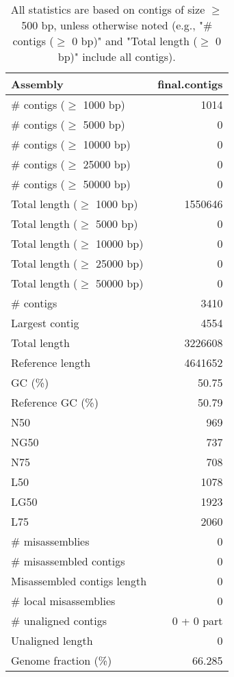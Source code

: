 \documentclass[12pt,a4paper]{article}
\begin{document}
\begin{table}[ht]
\begin{center}
\caption{All statistics are based on contigs of size $\geq$ 500 bp, unless otherwise noted (e.g., "\# contigs ($\geq$ 0 bp)" and "Total length ($\geq$ 0 bp)" include all contigs).}
\begin{tabular}{|l*{1}{|r}|}
\hline
Assembly & final.contigs \\ \hline
\# contigs ($\geq$ 1000 bp) & 1014 \\ \hline
\# contigs ($\geq$ 5000 bp) & 0 \\ \hline
\# contigs ($\geq$ 10000 bp) & 0 \\ \hline
\# contigs ($\geq$ 25000 bp) & 0 \\ \hline
\# contigs ($\geq$ 50000 bp) & 0 \\ \hline
Total length ($\geq$ 1000 bp) & 1550646 \\ \hline
Total length ($\geq$ 5000 bp) & 0 \\ \hline
Total length ($\geq$ 10000 bp) & 0 \\ \hline
Total length ($\geq$ 25000 bp) & 0 \\ \hline
Total length ($\geq$ 50000 bp) & 0 \\ \hline
\# contigs & 3410 \\ \hline
Largest contig & 4554 \\ \hline
Total length & 3226608 \\ \hline
Reference length & 4641652 \\ \hline
GC (\%) & 50.75 \\ \hline
Reference GC (\%) & 50.79 \\ \hline
N50 & 969 \\ \hline
NG50 & 737 \\ \hline
N75 & 708 \\ \hline
L50 & 1078 \\ \hline
LG50 & 1923 \\ \hline
L75 & 2060 \\ \hline
\# misassemblies & 0 \\ \hline
\# misassembled contigs & 0 \\ \hline
Misassembled contigs length & 0 \\ \hline
\# local misassemblies & 0 \\ \hline
\# unaligned contigs & 0 + 0 part \\ \hline
Unaligned length & 0 \\ \hline
Genome fraction (\%) & 66.285 \\ \hline

\end{tabular}
\end{center}
\end{table}
\end{document}
